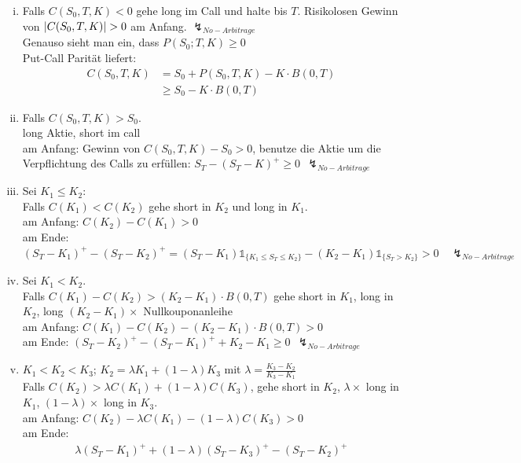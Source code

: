 \begin{enumerate}[(i)]
	\item Falls $C(S_0,T,K) < 0$ gehe long im Call und halte bis $T$. Risikolosen Gewinn von $\left\vert C(S_0,T,K)\right\vert> 0$ am Anfang. $\lightning_{No-Arbitrage}$\\
	Genauso sieht man ein, dass $P(S_0;T,K)\ge 0$\\
	Put-Call Parität liefert:
	\begin{equation*}
		\begin{aligned}
			C(S_0,T,K)&=S_0 + P(S_0,T,K)-K\cdot B(0,T)\\
			&\ge S_0 - K\cdot B(0,T)
		\end{aligned}
	\end{equation*}
	\item  Falls $C(S_0,T,K) >S_0$.\\
	long Aktie, short im call\\
	am Anfang: Gewinn von $C(S_0,T,K) -S_0>0$, benutze die Aktie um die Verpflichtung des Calls zu erfüllen: $S_T - (S_T-K)^+ \ge 0~~\lightning_{No-Arbitrage}$
	\item Sei $K_1 \le K_2$:\\
	Falls $C(K_1)<C(K_2)$ gehe  short in $K_2$ und long in $K_1$.\\
	am Anfang: $C(K_2) - C(K_1) > 0$\\
	am Ende: $(S_T-K_1)^+ -(S_T-K_2)^+ = (S_T-K_1)\mathbb{1}_{\{K_1\le S_T\le K_2\}}-(K_2-K_1)\mathbb{1}_{\{S_T>K_2\}}>0\quad \lightning_{No-Arbitrage}$
	\item Sei $K_1<K_2$.\\
	Falls $C(K_1)-C(K_2)>(K_2-K_1)\cdot B(0,T)$ gehe short in $K_1$, long in $K_2$, long $(K_2-K_1)\times$ Nullkouponanleihe\\ 
	am Anfang: $C(K_1)-C(K_2)-(K_2-K_1)\cdot B(0,T)>0$\\
	am Ende: $(S_T-K_2)^+ -(S_T-K_1)^+ +K_2-K_1 \ge 0~~ \lightning_{No-Arbitrage}$
	\item $K_1<K_2<K_3$; $K_2=\lambda K_1+(1-\lambda)K_3$ mit $\lambda=\frac{K_3-K_2}{K_3-K_1}$\\
	Falls $C(K_2)> \lambda C(K_1)+ (1-\lambda)C(K_3)$, gehe short in $K_2$, $\lambda \times$ long in $K_1$, $(1-\lambda) \times$ long in $K_3$.\\
	am Anfang: $C(K_2)-\lambda C(K_1)-(1-\lambda)C(K_3)>0$\\
	am Ende: 
	\begin{equation*}
	\begin{aligned}
		\lambda (S_T -K_1)^+ +(1-\lambda)(S_T-K_3)^+-(S_T-K_2)^+

\end{aligned}
\end{equation*}
\end{enumerate}
